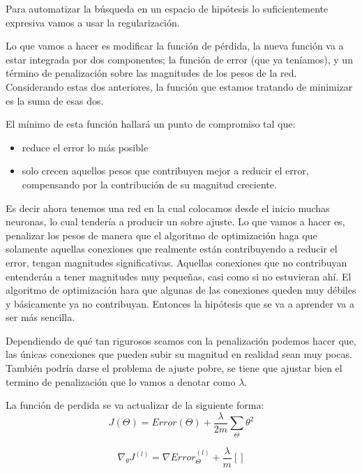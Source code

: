 Para automatizar la búsqueda en un espacio de hipótesis lo suficientemente expresiva vamos a usar la regularización.

Lo que vamos a hacer es modificar la función de pérdida, la nueva función va a estar integrada por dos componentes; la función de error (que ya teníamos), y un  término de penalización sobre las magnitudes de los pesos de la red. Considerando estas dos anteriores,  la función que estamos tratando de minimizar es  la suma de esas dos.

El mínimo de esta función hallará un punto de compromiso tal que:
\begin{itemize}
 \item reduce el error lo más posible
 \item solo crecen aquellos pesos que contribuyen mejor a reducir el error, compensando por la contribución de su magnitud creciente.
\end{itemize}

Es decir ahora tenemos una red en la cual colocamos desde el inicio muchas neuronas, lo cual tendería a producir un sobre ajuste. Lo que vamos a hacer es, penalizar los pesos de manera que el algoritmo de optimización haga que solamente aquellas conexiones que realmente están contribuyendo a reducir el error, tengan magnitudes significativas. Aquellas conexiones que no contribuyan entenderán a tener magnitudes muy pequeñas, casi como si no estuvieran ahí. El algoritmo de optimización hara que algunas de las conexiones queden muy débiles y básicamente ya no contribuyan. Entonces la hipótesis que se va a aprender va a ser más sencilla.

Dependiendo de qué tan rigurosos seamos con la penalización podemos hacer que, las únicas conexiones que pueden subir su magnitud en realidad sean muy pocas. También podría darse el problema de ajuste pobre, se  tiene que ajustar bien el termino de penalización que lo vamos a denotar como \emph{$\lambda$}.

La función de perdida se va actualizar de la siguiente forma:
\begin{equation}
 J(\Theta) = Error(\Theta)+\dfrac{\lambda}{2m}\sum_{\Theta}\theta^2
 \label{eq:errorR}
\end{equation}

\begin{equation}
 \nabla_{\theta}J^{(l)} = \nabla Error_{\Theta}^{(l)}+\dfrac{\lambda}{m}\left[ \right]
\end{equation}

